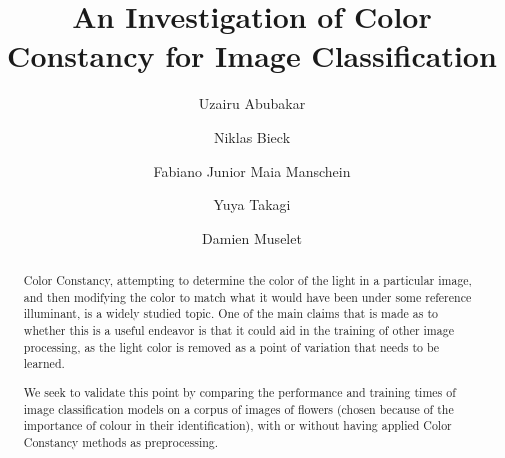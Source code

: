 \documentclass[runningheads]{llncs}
\begin{document}
\title{An Investigation of Color Constancy for Image Classification}

\author{
    Uzairu Abubakar \and 
    Niklas Bieck \and 
    Fabiano Junior Maia Manschein \and 
    Yuya Takagi \and 
    Damien Muselet
}




\maketitle

\begin{abstract}
Color Constancy, attempting to determine the color of the light in a particular image, and then 
modifying the color to match what it would have been under some reference illuminant, is a widely studied topic.
One of the main claims that is made as to whether this is a useful endeavor is that it could aid in the training
of other image processing, as the light color is removed as a point of variation that needs to be learned.

We seek to validate this point by comparing the performance and training times of image classification models on 
a corpus of images of flowers (chosen because of the importance of colour in their identification), with or without
having applied Color Constancy methods as preprocessing.
\end{abstract}



\end{document}
